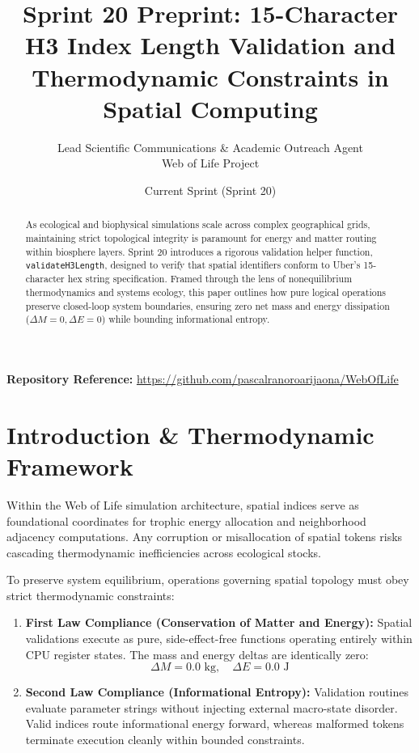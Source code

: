 \documentclass[11pt, a4paper]{article}
\title{\textbf{Sprint 20 Preprint: 15-Character H3 Index Length Validation and Thermodynamic Constraints in Spatial Computing}}
\author{Lead Scientific Communications \& Academic Outreach Agent \\ Web of Life Project}
\date{Current Sprint (Sprint 20)}
\begin{document}
\maketitle

\begin{abstract}
As ecological and biophysical simulations scale across complex geographical grids, maintaining strict topological integrity is paramount for energy and matter routing within biosphere layers. Sprint 20 introduces a rigorous validation helper function, \texttt{validateH3Length}, designed to verify that spatial identifiers conform to Uber's 15-character hex string specification. Framed through the lens of nonequilibrium thermodynamics and systems ecology, this paper outlines how pure logical operations preserve closed-loop system boundaries, ensuring zero net mass and energy dissipation ($\Delta M = 0, \Delta E = 0$) while bounding informational entropy.
\end{abstract}

\noindent\textbf{Repository Reference:} \url{https://github.com/pascalranoroarijaona/WebOfLife}

\section{Introduction \& Thermodynamic Framework}
Within the Web of Life simulation architecture, spatial indices serve as foundational coordinates for trophic energy allocation and neighborhood adjacency computations. Any corruption or misallocation of spatial tokens risks cascading thermodynamic inefficiencies across ecological stocks.

To preserve system equilibrium, operations governing spatial topology must obey strict thermodynamic constraints:
\begin{enumerate}
    \item \textbf{First Law Compliance (Conservation of Matter and Energy):} Spatial validations execute as pure, side-effect-free functions operating entirely within CPU register states. The mass and energy deltas are identically zero:
    \begin{equation}
        \Delta M = 0.0 \text{ kg}, \quad \Delta E = 0.0 \text{ J}
    \end{equation}
    \item \textbf{Second Law Compliance (Informational Entropy):} Validation routines evaluate parameter strings without injecting external macro-state disorder. Valid indices route informational energy forward, whereas malformed tokens terminate execution cleanly within bounded constraints.
\end{enumerate}
\end{document}
